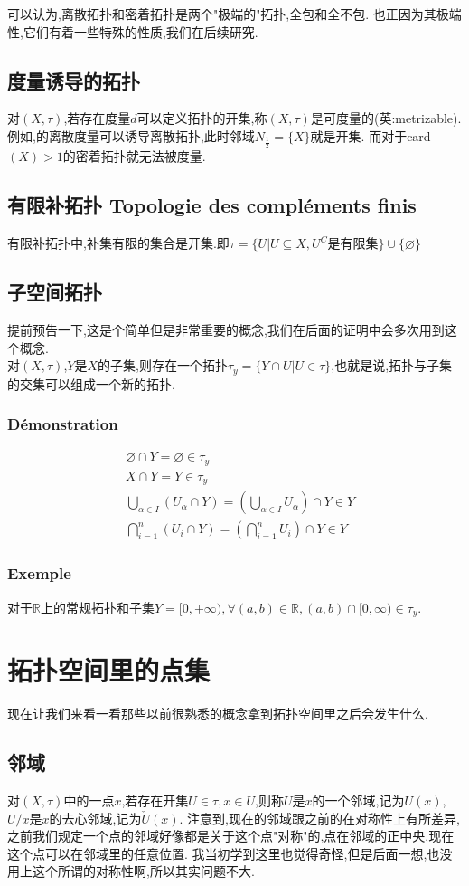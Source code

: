 \documentclass[12pt, a4paper, oneside]{ctexbook}
\newcommand{\R }{\mathbb{R}}%
\begin{document}
  可以认为,离散拓扑和密着拓扑是两个"极端的"拓扑,全包和全不包.
  也正因为其极端性,它们有着一些特殊的性质,我们在后续研究.
  
  \subsection{度量诱导的拓扑}
  对$(X,\tau)$,若存在度量$d$可以定义拓扑的开集,称$(X,\tau)$是可度量的(英:metrizable).
  例如,的离散度量可以诱导离散拓扑,此时邻域$N_\frac{1}{2}=\{X\}$就是开集.
  而对于card$(X)>1$的密着拓扑就无法被度量.
  \subsection{有限补拓扑 Topologie des compléments finis}
  有限补拓扑中,补集有限的集合是开集.即$\tau=\{U|U\subseteq X,U^C\text{是有限集} \}\cup \{\varnothing\}$

  \subsection{子空间拓扑}\label{myref:soustopo}
  提前预告一下,这是个简单但是非常重要的概念,我们在后面的证明中会多次用到这个概念.\\
  对$(X,\tau)$,$Y$是$X$的子集,则存在一个拓扑$\tau_y=\{Y\cap U| U\in\tau\}$,也就是说,拓扑与子集的交集可以组成一个新的拓扑.
  \subsubsection{Démonstration}
  $$
  \begin{aligned}&
  \varnothing\cap Y=\varnothing\in\tau_y\\&
  X\cap Y=Y\in\tau_y\\&
  \bigcup_{\alpha\in I}(U_\alpha\cap Y)=(\bigcup_{\alpha\in I}U_\alpha)\cap Y\in Y\\&
  \bigcap^n_{i=1}(U_i\cap Y)=( \bigcap^n_{i=1}U_i)\cap Y\in Y
  \end{aligned}
  $$
  \subsubsection{Exemple}
  对于$\R$上的常规拓扑和子集$Y=[0,+\infty),\forall (a,b)\in\R,(a,b)\cap[0,\infty)\in\tau_y$.
\section{拓扑空间里的点集}
  现在让我们来看一看那些以前很熟悉的概念拿到拓扑空间里之后会发生什么.
  \subsection{邻域}
  对$(X,\tau)$中的一点$x$,若存在开集$U\in\tau, x\in U$,则称$U$是$x$的一个邻域,记为$U(x)$,$U/x$是$x$的去心邻域,记为$\check{U}(x) $.
  注意到,现在的邻域跟之前的在对称性上有所差异,之前我们规定一个点的邻域好像都是关于这个点"对称"的,点在邻域的正中央,现在这个点可以在邻域里的任意位置.
  我当初学到这里也觉得奇怪,但是后面一想,也没用上这个所谓的对称性啊,所以其实问题不大.
\end{document}
